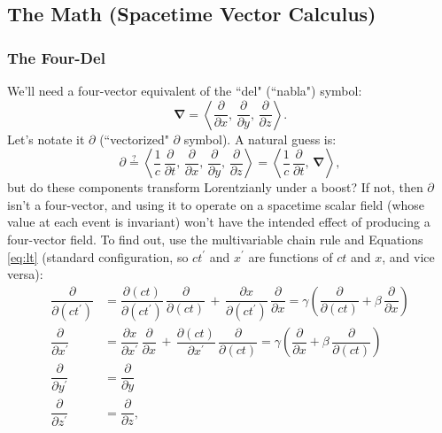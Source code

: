 \documentclass[12pt]{article}
\newcommand{\del}{\boldsymbol{\nabla}}
\begin{document}
\subsection{The Math (Spacetime Vector Calculus)}


\subsubsection{The Four-Del}\label{sssec:fd}

We'll need a four-vector equivalent of the ``del" (``nabla") symbol:
\begin{equation*}
\del = \left \langle \dfrac{\partial}{\partial x}, \, \dfrac{\partial}{\partial y}, \, \dfrac{\partial}{\partial z} \right \rangle .
\end{equation*}
Let's notate it $\partialup$ (``vectorized" $\partial$ symbol). A natural guess is:
\begin{equation*}
\partialup \stackrel{?}{=} \left \langle \dfrac{1}{c} \, \dfrac{\partial}{\partial t} , \, \dfrac{\partial}{\partial x}, \, \dfrac{\partial}{\partial y}, \, \dfrac{\partial}{\partial z} \right \rangle = \left \langle \dfrac{1}{c} \, \dfrac{\partial}{\partial t} , \, \del \right \rangle ,
\end{equation*}
but do these components transform Lorentzianly under a boost? If not, then $\partialup$ isn't a four-vector, and using it to operate on a spacetime scalar field (whose value at each event is invariant) won't have the intended effect of producing a four-vector field. To find out, use the multivariable chain rule and Equations \ref{eq:lt} (standard configuration, so $ct^\prime$ and $x^\prime$ are functions of $ct$ and $x$, and vice versa):
\begin{equation*}
\begin{split}
\dfrac{\partial}{\partial (ct^\prime)} &= \dfrac{\partial (ct)}{\partial (ct^\prime)} \, \dfrac{\partial}{\partial (ct)} \, + \, \dfrac{\partial x}{\partial (ct^\prime)} \, \dfrac{\partial}{\partial x} = \gamma \left( \dfrac{\partial}{\partial (ct)} + \beta \, \dfrac{\partial}{\partial x} \right) \\[3pt]
\dfrac{\partial}{\partial x^\prime} &= \dfrac{\partial x}{\partial x^\prime} \, \dfrac{\partial}{\partial x} \, + \, \dfrac{\partial (ct)}{\partial x^\prime} \, \dfrac{\partial}{\partial (ct)}  = \gamma \left( \dfrac{\partial}{\partial x} + \beta \, \dfrac{\partial}{\partial (ct)}  \right) \\[3pt]
\dfrac{\partial}{\partial y^\prime} &= \dfrac{\partial}{\partial y} \\[3pt]
\dfrac{\partial}{\partial z^\prime} &= \dfrac{\partial}{\partial z} ,
\end{split}
\end{equation*}
\end{document}
